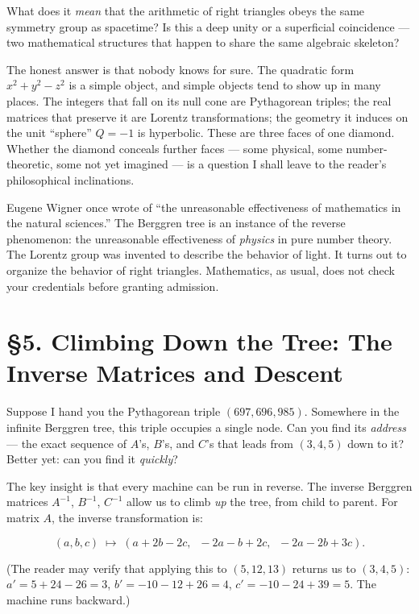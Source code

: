 What does it \emph{mean} that the arithmetic of right triangles obeys the same symmetry group as spacetime? Is this a deep unity or a superficial coincidence --- two mathematical structures that happen to share the same algebraic skeleton?

The honest answer is that nobody knows for sure. The quadratic form \(x^2 + y^2 - z^2\) is a simple object, and simple objects tend to show up in many places. The integers that fall on its null cone are Pythagorean triples; the real matrices that preserve it are Lorentz transformations; the geometry it induces on the unit ``sphere'' \(Q = -1\) is hyperbolic. These are three faces of one diamond. Whether the diamond conceals further faces --- some physical, some number-theoretic, some not yet imagined --- is a question I shall leave to the reader's philosophical inclinations.

Eugene Wigner once wrote of ``the unreasonable effectiveness of mathematics in the natural sciences.'' The Berggren tree is an instance of the reverse phenomenon: the unreasonable effectiveness of \emph{physics} in pure number theory. The Lorentz group was invented to describe the behavior of light. It turns out to organize the behavior of right triangles. Mathematics, as usual, does not check your credentials before granting admission.



\section{§5. Climbing Down the Tree: The Inverse Matrices and Descent}\label{ch16-climbing-down-the-tree-the-inverse-matrices-and-descent}

Suppose I hand you the Pythagorean triple \((697, 696, 985)\). Somewhere in the infinite Berggren tree, this triple occupies a single node. Can you find its \emph{address} --- the exact sequence of \(A\)'s, \(B\)'s, and \(C\)'s that leads from \((3, 4, 5)\) down to it? Better yet: can you find it \emph{quickly}?

The key insight is that every machine can be run in reverse. The inverse Berggren matrices \(A^{-1}\), \(B^{-1}\), \(C^{-1}\) allow us to climb \emph{up} the tree, from child to parent. For matrix \(A\), the inverse transformation is:

\[(a, b, c) \;\longmapsto\; (a + 2b - 2c,\;\; -2a - b + 2c,\;\; -2a - 2b + 3c).\]

(The reader may verify that applying this to \((5, 12, 13)\) returns us to \((3, 4, 5)\): \(a' = 5 + 24 - 26 = 3\), \(b' = -10 - 12 + 26 = 4\), \(c' = -10 - 24 + 39 = 5\). The machine runs backward.)

